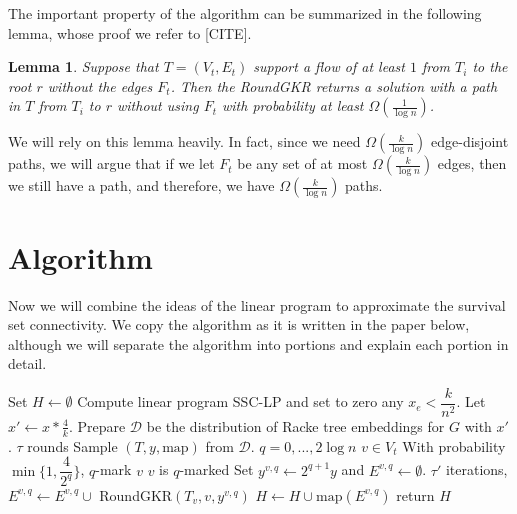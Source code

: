 \documentclass[12pt]{article}
\newtheorem{lemma}{Lemma}
\begin{document}
The important property of the algorithm can be summarized in the following lemma, whose proof we refer to [CITE].

\begin{lemma}
\label{lem:findpath}
Suppose that $T = (V_t, E_t)$ support a flow of at least $1$ from $T_i$ to the root $r$ without the edges $F_t$. Then the RoundGKR returns a solution with a path in $T$ from $T_i$ to $r$ without using $F_t$ with probability at least $\Omega(\frac{1}{\log n})$. 
\end{lemma}

We will rely on this lemma heavily. In fact, since we need $\Omega(\frac{k}{\log n})$ edge-disjoint paths, we will argue that if we let $F_t$ be any set of at most $\Omega(\frac{k}{\log n})$ edges, then we still have a path, and therefore, we have $\Omega(\frac{k}{\log n})$ paths.  

\section{Algorithm}

Now we will combine the ideas of the linear program to approximate the survival set connectivity. We copy the algorithm as it is written in the paper below, although we will separate the algorithm into portions and explain each portion in detail.
\begin{codebox}
\li Set $H \leftarrow \emptyset$
\li Compute linear program SSC-LP and set to zero any $x_e < \dfrac{k}{n^2}$.
\li Let $x' \leftarrow x*\frac{4}{k}$. 
\li Prepare $\mathcal{D}$ be the distribution of Racke tree embeddings for $G$ with $x'$.
\li \For $\tau$ rounds \Do
\li Sample $(T, y, \text{map})$ from $\mathcal{D}$. 
\li \For $q = 0, ..., 2\log n$ \Do
\li \For $v \in V_t$ \Do
\li With probability $\min\{1, \dfrac{4}{2^q}\}$, $q$-mark $v$
\li \If $v$ is $q$-marked \Then
\li Set $y^{v, q}\leftarrow 2^{q+1}y$ and $E^{v,q} \leftarrow \emptyset$.
\li \For $\tau'$ iterations, \Do
\li $E^{v,q} \leftarrow E^{v,q} \cup$ RoundGKR$(T_v, v, y^{v,q})$ \End
\li $H \leftarrow H \cup \text{map}(E^{v,q})$ \End \End \End \End
\li return $H$
\end{codebox}
\end{document}
